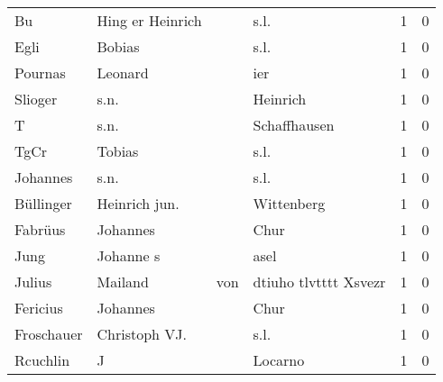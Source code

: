\begin{center}
\begin{tiny}
\begin{longtabu}{llllrr}
                       Bu &                   Hing er Heinrich &             &                                        s.l. &          1 &         0 \\
                     Egli &                             Bobias &             &                                        s.l. &          1 &         0 \\
                  Pournas &                            Leonard &             &                                         ier &          1 &         0 \\
                  Slioger &                               s.n. &             &                                    Heinrich &          1 &         0 \\
                        T &                               s.n. &             &                                Schaffhausen &          1 &         0 \\
                     TgCr &                             Tobias &             &                                        s.l. &          1 &         0 \\
                 Johannes &                               s.n. &             &                                        s.l. &          1 &         0 \\
                Büllinger &                      Heinrich jun. &             &                                  Wittenberg &          1 &         0 \\
                  Fabrüus &                           Johannes &             &                                        Chur &          1 &         0 \\
                     Jung &                          Johanne s &             &                                        asel &          1 &         0 \\
                   Julius &                            Mailand &         von &                       dtiuho tlvtttt Xsvezr &          1 &         0 \\
                 Fericius &                           Johannes &             &                                        Chur &          1 &         0 \\
               Froschauer &                      Christoph VJ. &             &                                        s.l. &          1 &         0 \\
                 Rcuchlin &                                  J &             &                                     Locarno &          1 &         0 \\

\end{longtabu}
\end{tiny}
\end{center}
